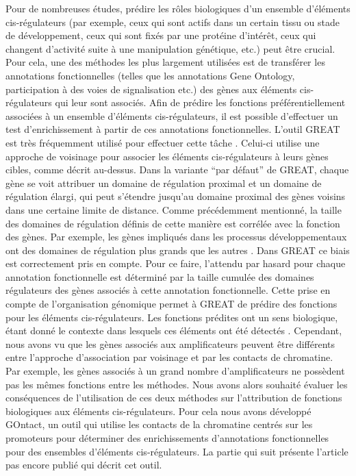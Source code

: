 Pour de nombreuses études, prédire les rôles biologiques d’un ensemble d’éléments \gls{cis}-régulateurs (par exemple, ceux qui sont actifs dans un certain tissu ou stade de développement, ceux qui sont fixés par une protéine d’intérêt, ceux qui changent d’activité suite à une manipulation génétique, etc.) peut être crucial. Pour cela, une des méthodes les plus largement utilisées est de transférer les annotations fonctionnelles (telles que les annotations Gene Ontology, participation à des voies de signalisation etc.) des gènes aux éléments \gls{cis}-régulateurs qui leur sont associés. Afin de prédire les fonctions préférentiellement associées à un ensemble d’éléments \gls{cis}-régulateurs, il est possible d’effectuer un test d’enrichissement à partir de ces annotations fonctionnelles. L’outil GREAT est très fréquemment utilisé pour effectuer cette tâche \citep{mclean_great_2010}. Celui-ci utilise une approche de voisinage pour associer les éléments \gls{cis}-régulateurs à leurs gènes cibles, comme décrit au-dessus. Dans la variante “par défaut” de GREAT, chaque gène se voit attribuer un domaine de régulation proximal et un domaine de régulation élargi, qui peut s’étendre jusqu’au domaine proximal des gènes voisins dans une certaine limite de distance. Comme précédemment mentionné, la taille des domaines de régulation définis de cette manière est corrélée avec la fonction des gènes. Par exemple, les gènes impliqués dans les processus développementaux ont des domaines de régulation plus grands que les autres \citep{mclean_great_2010}. Dans GREAT ce biais est correctement pris en compte. Pour ce faire, l’attendu par hasard pour chaque annotation fonctionnelle est déterminé par la taille cumulée des domaines régulateurs des gènes associés à cette annotation fonctionnelle. Cette prise en compte de l’organisation génomique permet à GREAT de prédire des fonctions pour les éléments \gls{cis}-régulateurs. Les fonctions prédites ont un sens biologique, étant donné le contexte dans lesquels ces éléments ont été détectés \citep{mclean_great_2010, rada-iglesias_unique_2011}. Cependant, nous avons vu que les gènes associés aux \glspl{amplificateur} peuvent être différents entre l’approche d’association par voisinage et par les contacts de chromatine. Par exemple, les gènes associés à un grand nombre d’\glspl{amplificateur} ne possèdent pas les mêmes fonctions entre les méthodes. Nous avons alors souhaité évaluer les conséquences de l’utilisation de ces deux méthodes sur l’attribution de fonctions biologiques aux éléments \gls{cis}-régulateurs. Pour cela nous avons développé GOntact, un outil qui utilise les contacts de la chromatine centrés sur les promoteurs pour déterminer des enrichissements d’annotations fonctionnelles pour des ensembles d’éléments \gls{cis}-régulateurs. La partie qui suit présente l'article pas encore publié qui décrit cet outil.
